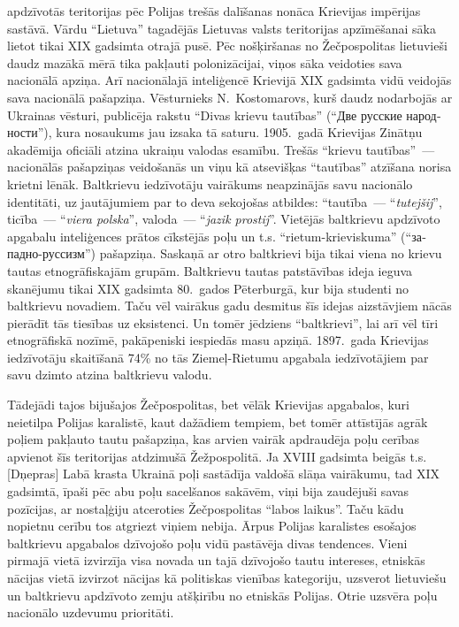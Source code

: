 \documentclass[twoside,a5paper,12pt,fleqn,openany]{extbook}
\newcommand{\pltxti}[1]{\textit{\textpolish{#1}}}
\newcommand{\rutxti}[1]{\textrussian{#1}}
\begin{document}
 apdzīvotās teritorijas pēc Polijas trešās dalīšanas nonāca Krievijas impērijas sastāvā. Vārdu ``Lietuva'' tagadējās Lietuvas valsts teritorijas apzīmēšanai sāka lietot tikai XIX gadsimta otrajā pusē. Pēc nošķiršanas no Žečpospolitas lietuvieši daudz mazākā mērā tika pakļauti polonizācijai, viņos sāka veidoties sava nacionālā apziņa. Arī  nacionālajā inteliģencē Krievijā XIX gadsimta vidū veidojās sava nacionālā pašapziņa. Vēsturnieks N.~Kostomarovs, kurš daudz nodarbojās ar Ukrainas vēsturi, publicēja rakstu ``Divas krievu tautības'' (``\rutxti{Две русские народности}''), kura nosaukums jau izsaka tā saturu. 1905.~gadā Krievijas Zinātņu akadēmija oficiāli atzina ukraiņu valodas esamību. Trešās ``krievu tautības''~---  nacionālās pašapziņas veidošanās un viņu kā atsevišķas ``tautības'' atzīšana norisa krietni lēnāk. Baltkrievu iedzīvotāju vairākums neapzinājās savu nacionālo identitāti, uz jautājumiem par to deva sekojošas atbildes: ``tautība~--- ``\pltxti{tutejšij}'', ticība~--- ``\pltxti{viera polska}'', valoda~--- ``\pltxti{jazik prostij}''. Vietējās baltkrievu apdzīvoto apgabalu inteliģences prātos cīkstējās poļu un t.s. ``rietum-krieviskuma'' (``\rutxti{западно-руссизм}'') pašapziņa. Saskaņā ar otro baltkrievi bija tikai viena no krievu tautas etnogrāfiskajām grupām. Baltkrievu tautas patstāvības ideja ieguva skanējumu tikai XIX gadsimta 80.~gados Pēterburgā, kur bija studenti no baltkrievu novadiem. Taču vēl vairākus gadu desmitus šīs idejas aizstāvjiem nācās pierādīt tās tiesības uz eksistenci. Un tomēr jēdziens ``baltkrievi'', lai arī vēl tīri etnogrāfiskā nozīmē, pakāpeniski iespiedās masu apziņā. 1897.~gada Krievijas iedzīvotāju skaitīšanā 74\% no tās Ziemeļ-Rietumu apgabala iedzīvotājiem par savu dzimto atzina baltkrievu valodu.

Tādejādi tajos bijušajos Žečpospolitas, bet vēlāk Krievijas apgabalos, kuri neietilpa Polijas karalistē, kaut dažādiem tempiem, bet tomēr attīstījās agrāk poļiem pakļauto tautu pašapziņa, kas arvien vairāk apdraudēja poļu cerības apvienot šīs teritorijas atdzimušā Žežpospolitā. Ja XVIII gadsimta beigās t.s. [Dņepras] Labā krasta Ukrainā poļi sastādīja valdošā slāņa vairākumu, tad XIX gadsimtā, īpaši pēc abu poļu sacelšanos sakāvēm, viņi bija zaudējuši savas pozīcijas, ar nostaļģiju atceroties Žečpospolitas ``labos laikus''. Taču kādu nopietnu cerību tos atgriezt viņiem nebija. Ārpus Polijas karalistes esošajos baltkrievu apgabalos dzīvojošo poļu vidū pastāvēja divas tendences. Vieni pirmajā vietā izvirzīja visa novada un tajā dzīvojošo tautu intereses, etniskās nācijas vietā izvirzot nācijas kā politiskas vienības kategoriju, uzsverot lietuviešu un baltkrievu apdzīvoto zemju atšķirību no etniskās Polijas. Otrie uzsvēra poļu nacionālo uzdevumu prioritāti.
\end{document}
